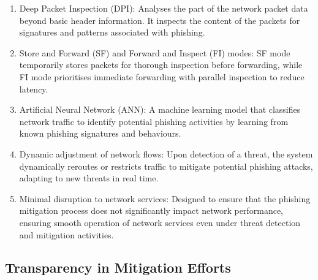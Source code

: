 \begin{enumerate}
    \item Deep Packet Inspection (DPI): Analyses the part of the network packet data beyond basic header information. It inspects the content of the packets for signatures and patterns associated with phishing.
    \item Store and Forward (SF) and Forward and Inspect (FI) modes: SF mode temporarily stores packets for thorough inspection before forwarding, while FI mode prioritises immediate forwarding with parallel inspection to reduce latency.
    \item Artificial Neural Network (ANN): A machine learning model that classifies network traffic to identify potential phishing activities by learning from known phishing signatures and behaviours.
    \item Dynamic adjustment of network flows: Upon detection of a threat, the system dynamically reroutes or restricts traffic to mitigate potential phishing attacks, adapting to new threats in real time.
    \item Minimal disruption to network services: Designed to ensure that the phishing mitigation process does not significantly impact network performance, ensuring smooth operation of network services even under threat detection and mitigation activities.
\end{enumerate}

\subsection{Transparency in Mitigation Efforts}

